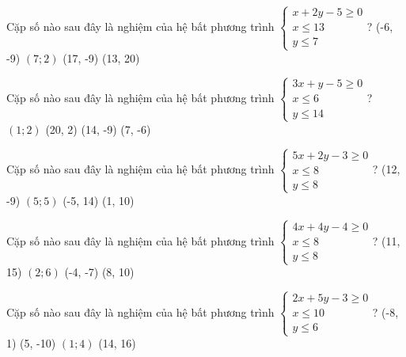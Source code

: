 \begin{ex}
 Cặp số nào sau đây là nghiệm của hệ bất phương trình $\left\{ \begin{array}{l} 
    x + 2 y - 5 \ge 0\\ 
    x\le 13\\ 
    y \le 7
    \end{array} \right.$? 
\choice
{ (-6, -9) }
   { \True $(7;2)$ }
     { (17, -9) }
    { (13, 20) }
\end{ex}

\begin{ex}
 Cặp số nào sau đây là nghiệm của hệ bất phương trình $\left\{ \begin{array}{l} 
    3 x + y - 5 \ge 0\\ 
    x\le 6\\ 
    y \le 14
    \end{array} \right.$? 
\choice
{ \True $(1;2)$ }
   { (20, 2) }
     { (14, -9) }
    { (7, -6) }
\end{ex}

\begin{ex}
 Cặp số nào sau đây là nghiệm của hệ bất phương trình $\left\{ \begin{array}{l} 
    5 x + 2 y - 3 \ge 0\\ 
    x\le 8\\ 
    y \le 8
    \end{array} \right.$? 
\choice
{ (12, -9) }
   { \True $(5;5)$ }
     { (-5, 14) }
    { (1, 10) }
\end{ex}

\begin{ex}
 Cặp số nào sau đây là nghiệm của hệ bất phương trình $\left\{ \begin{array}{l} 
    4 x + 4 y - 4 \ge 0\\ 
    x\le 8\\ 
    y \le 8
    \end{array} \right.$? 
\choice
{ (11, 15) }
   { \True $(2;6)$ }
     { (-4, -7) }
    { (8, 10) }
\end{ex}

\begin{ex}
 Cặp số nào sau đây là nghiệm của hệ bất phương trình $\left\{ \begin{array}{l} 
    2 x + 5 y - 3 \ge 0\\ 
    x\le 10\\ 
    y \le 6
    \end{array} \right.$? 
\choice
{ (-8, 1) }
   { (5, -10) }
     { \True $(1;4)$ }
    { (14, 16) }
\end{ex}

